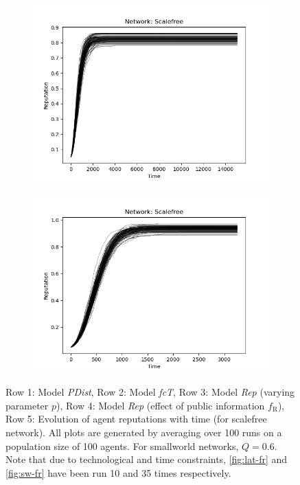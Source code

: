 \documentclass[11pt, A4 paper, twocolumn ]{article}
\newcommand{\fr}{$ f_{\text{R}} $}
\begin{document}
\begin{figure}[p]
\begin{subfigure}[b]{0.3\textwidth}
	\caption{}
	\label{fig:repevol1}
\end{subfigure}
\begin{subfigure}[b]{0.3\textwidth}
	\centering
	\includegraphics[width=\textwidth]{graphs/rep_te_sfp0.3}
	\caption{}
	\label{fig:repevol2}
\end{subfigure}
\begin{subfigure}[b]{0.3\textwidth}
	\centering
	\includegraphics[width=\textwidth]{graphs/rep_te_sfp0.5}
	\caption{}
	\label{fig:repevol3}
\end{subfigure}
		\caption{\footnotesize Row 1: Model \textit{PDist},
			Row 2: Model \textit{fcT}, 
			Row 3: Model \textit{Rep} (varying parameter $ p $),
		Row 4:  Model \textit{Rep} (effect of public information \fr),
	Row 5: Evolution of agent reputations with time (for scalefree network). All plots are generated by averaging over 100 runs on a population size of 100 agents. For smallworld networks, $ Q=0.6 $. Note that due to technological and time constraints, \ref{fig:lat-fr} and \ref{fig:sw-fr} have been run 10 and 35 times respectively.}
		\label{fig:results}
	\end{figure}
	
\end{document}
